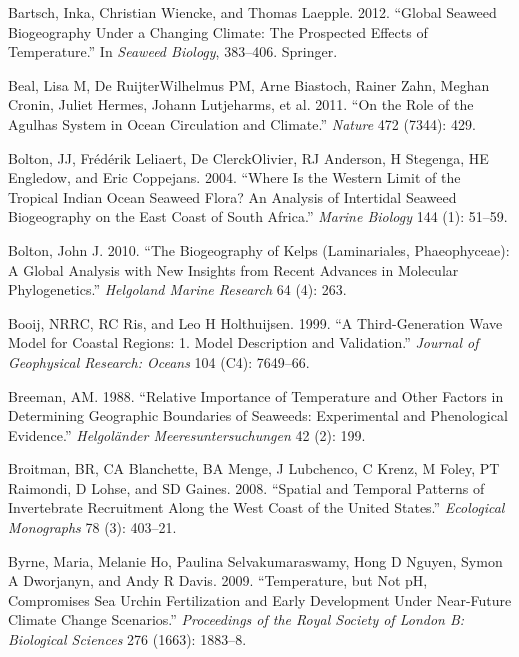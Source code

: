 \documentclass[12pt,a4paper,]{article}
\begin{document}
\hypertarget{refs}{}
\leavevmode\hypertarget{ref-Bartsch2012}{}%
Bartsch, Inka, Christian Wiencke, and Thomas Laepple. 2012. ``Global
Seaweed Biogeography Under a Changing Climate: The Prospected Effects of
Temperature.'' In \emph{Seaweed Biology}, 383--406. Springer.

\leavevmode\hypertarget{ref-Beal2011}{}%
Beal, Lisa M, De RuijterWilhelmus PM, Arne Biastoch, Rainer Zahn, Meghan
Cronin, Juliet Hermes, Johann Lutjeharms, et al. 2011. ``On the Role of
the Agulhas System in Ocean Circulation and Climate.'' \emph{Nature} 472
(7344): 429.

\leavevmode\hypertarget{ref-Bolton2004}{}%
Bolton, JJ, Frédérik Leliaert, De ClerckOlivier, RJ Anderson, H
Stegenga, HE Engledow, and Eric Coppejans. 2004. ``Where Is the Western
Limit of the Tropical Indian Ocean Seaweed Flora? An Analysis of
Intertidal Seaweed Biogeography on the East Coast of South Africa.''
\emph{Marine Biology} 144 (1): 51--59.

\leavevmode\hypertarget{ref-Bolton2010}{}%
Bolton, John J. 2010. ``The Biogeography of Kelps (Laminariales,
Phaeophyceae): A Global Analysis with New Insights from Recent Advances
in Molecular Phylogenetics.'' \emph{Helgoland Marine Research} 64 (4):
263.

\leavevmode\hypertarget{ref-Booij1999}{}%
Booij, NRRC, RC Ris, and Leo H Holthuijsen. 1999. ``A Third-Generation
Wave Model for Coastal Regions: 1. Model Description and Validation.''
\emph{Journal of Geophysical Research: Oceans} 104 (C4): 7649--66.

\leavevmode\hypertarget{ref-Breeman1988}{}%
Breeman, AM. 1988. ``Relative Importance of Temperature and Other
Factors in Determining Geographic Boundaries of Seaweeds: Experimental
and Phenological Evidence.'' \emph{Helgoländer Meeresuntersuchungen} 42
(2): 199.

\leavevmode\hypertarget{ref-Broitman2008}{}%
Broitman, BR, CA Blanchette, BA Menge, J Lubchenco, C Krenz, M Foley, PT
Raimondi, D Lohse, and SD Gaines. 2008. ``Spatial and Temporal Patterns
of Invertebrate Recruitment Along the West Coast of the United States.''
\emph{Ecological Monographs} 78 (3): 403--21.

\leavevmode\hypertarget{ref-Byrne2009}{}%
Byrne, Maria, Melanie Ho, Paulina Selvakumaraswamy, Hong D Nguyen, Symon
A Dworjanyn, and Andy R Davis. 2009. ``Temperature, but Not pH,
Compromises Sea Urchin Fertilization and Early Development Under
Near-Future Climate Change Scenarios.'' \emph{Proceedings of the Royal
Society of London B: Biological Sciences} 276 (1663): 1883--8.
\end{document}
